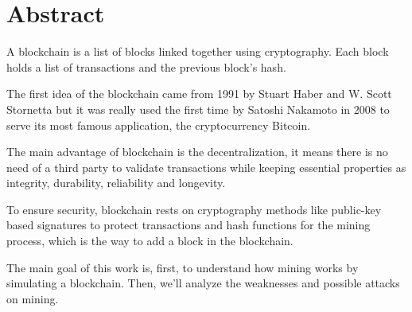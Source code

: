 \section{Abstract}

A blockchain is a list of blocks linked together using cryptography. Each block holds a list of transactions and the previous block's hash.

The first idea of the blockchain came from 1991 by Stuart Haber and W. Scott Stornetta but it was really used the first time by Satoshi Nakamoto in 2008 to serve its most famous application, the cryptocurrency Bitcoin. \newline

The main advantage of blockchain is the decentralization, it means there is no need of a third party to validate transactions while keeping essential properties as integrity, durability, reliability and longevity. \newline

To ensure security, blockchain rests on cryptography methods like public-key based signatures to protect transactions and hash functions for the mining process, which is the way to add a block in the blockchain.

The main goal of this work is, first, to understand how mining works by simulating a blockchain. Then, we'll analyze the weaknesses and possible attacks on mining.
